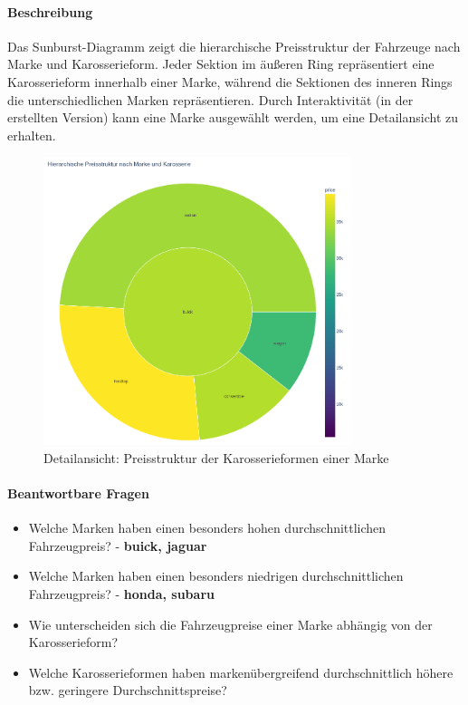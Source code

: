 \documentclass[a4paper,12pt]{article}
\begin{document}
\paragraph{Beschreibung}
Das Sunburst-Diagramm zeigt die hierarchische Preisstruktur der Fahrzeuge nach Marke und Karosserieform.
Jeder Sektion im äußeren Ring repräsentiert eine Karosserieform innerhalb einer Marke, während die Sektionen des inneren Rings die unterschiedlichen Marken repräsentieren.
Durch Interaktivität (in der erstellten Version) kann eine Marke ausgewählt werden, um eine Detailansicht zu erhalten.

\begin{figure}[H]
    \centering
    \includegraphics[width=0.8\textwidth]{../images/preisstruktur_nach_marke_karosserie_clicked.png} %
    \caption{Detailansicht: Preisstruktur der Karosserieformen einer Marke}
    \label{fig:vis4}
  \end{figure}



\hfill \break

\paragraph{Beantwortbare Fragen}
\begin{itemize}
  \item Welche Marken haben einen besonders hohen durchschnittlichen Fahrzeugpreis? - \textbf{buick, jaguar}
  \item Welche Marken haben einen besonders niedrigen durchschnittlichen Fahrzeugpreis? - \textbf{honda, subaru}
  \item Wie unterscheiden sich die Fahrzeugpreise einer Marke abhängig von der Karosserieform?
  \item Welche Karosserieformen haben markenübergreifend durchschnittlich höhere bzw. geringere Durchschnittspreise?
\end{itemize}
\end{document}
